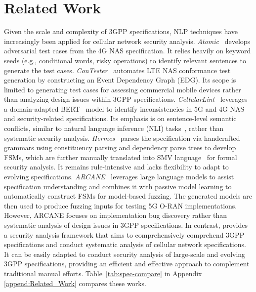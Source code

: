 \section{Related Work}
\label{sect:related}

\noindent Given the scale and complexity of 3GPP specifications, NLP techniques have increasingly been applied for cellular network security analysis. 
\textit{Atomic}~\cite{chen2021bookworm} develops adversarial test cases from the 4G NAS specification. It relies heavily on keyword seeds (e.g., conditional words, risky operations) to identify relevant sentences to generate the test cases. 
\textit{ConTester}~\cite{chen2023sherlock} automates LTE NAS conformance test generation by constructing an Event Dependency Graph (EDG). 
Its scope is limited to generating test cases for assessing commercial mobile devices rather than analyzing design issues within 3GPP specifications.  
\textit{CellularLint}~\cite{rahman2024cellularlint} leverages a domain-adapted BERT~\cite{devlin2019bert} model to identify inconsistencies in 5G and 4G NAS and security-related specifications. Its emphasis is on sentence-level semantic conflicts, similar to natural language inference (NLI) tasks~\cite{dagan2005pascal,bowman2015largeannotatedcorpuslearning}, rather than systematic security analysis. 
\textit{Hermes}~\cite{al2024hermes} parses the specification via handcrafted grammars using constituency parsing and dependency parse trees to develop FSMs, which are further manually translated into SMV language~\cite{clarke1996symbolic,al2024hermes,hussain20195greasoner,hussain2018lteinspector} for formal security analysis. 
It remains rule-intensive and lacks flexibility to adapt to evolving specifications. \textit{ARCANE}~\cite{tan2025automated} leverages large language models to assist specification understanding and combines it with passive model learning to automatically construct 
FSMs for model-based fuzzing. The generated models are then used to produce fuzzing inputs for testing 5G O-RAN implementations. However, ARCANE focuses on implementation bug discovery rather than systematic analysis of design issues in 3GPP specifications. In contrast, \lm provides a security analysis framework that aims to comprehensively comprehend 3GPP specifications and conduct systematic analysis of cellular network specifications. It can be easily adapted to conduct security analysis of large-scale and evolving 3GPP specifications, providing an efficient and effective approach to complement traditional manual efforts. Table~\ref{tab:spec-compare} in Appendix \ref{append:Related_Work} compares these works.

